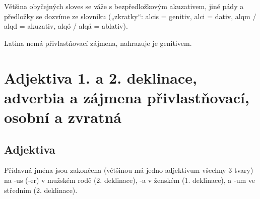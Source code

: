 \documentclass[12pt]{article}					%
\begin{document}
        Většina obyčejných sloves se váže s bezpředložkovým akuzativem, jiné pády a předložky se dozvíme ze slovníku („zkratky“: alcis = genitiv, alci = dativ, alqm / alqd = akuzativ, alqó / alqá = ablativ).

        Latina nemá přivlastňovací zájmena, nahrazuje je genitivem.

\section{Adjektiva 1. a 2. deklinace, adverbia a zájmena přivlastňovací, osobní a zvratná}
    \subsection{Adjektiva}
        Přídavná jména jsou zakončena (většinou má jedno adjektivum všechny 3 tvary) na -us (-er) v mužském rodě (2. deklinace), -a v ženském (1. deklinace), a -um ve středním (2. deklinace).

\newpage
\end{document}
